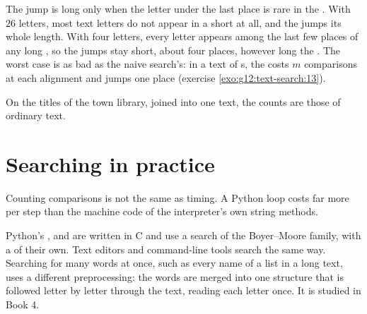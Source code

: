 The jump is long only when the letter under the last place is rare in the . With $26$ letters, most text
letters do not appear in a short  at all, and the  jumps its whole length. With four letters, every
letter appears among the last few places of any long , so the jumps stay short, about four places, however
long the . The worst case is as bad as the naive search's: in a text of s, the 
 costs $m$ comparisons at each alignment and jumps one place (exercise \ref{exo:g12:text-search:13}).

On the titles of the town library, joined into one text, the counts are those of ordinary text.

\label{lst:g12:text-search:titles}

\label{out:g12:text-search:titles}

\section{Searching in practice}\label{sec:g12:text-search:practice}

Counting comparisons is not the same as timing. A Python loop costs far more per step than the machine code of the
interpreter's own string methods.

\label{lst:g12:text-search:measure}

\label{out:g12:text-search:measure}

\begin{inpractice}
Python's ,  and  are written in C and use a search of the Boyer--Moore family,
with a  of their own. Text editors and command-line tools search the same way. Searching for many words at
once, such as every name of a list in a long text, uses a different preprocessing: the words are merged into one
structure that is followed letter by letter through the text, reading each letter once. It is studied in Book 4.
\end{inpractice}

